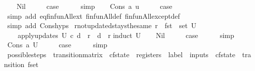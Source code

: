 \begin{isabellebody}
\ \ \isamarkupfalse%
\ Nil\isanewline
\ \ \isamarkupfalse%
\ \isamarkupfalse%
\ {\isacharquery}case\isanewline
\ \ \ \ \isamarkupfalse%
\ simp\isanewline
{}\isamarkupfalse%
\isanewline
\ \ \isamarkupfalse%
\ {\isacharparenleft}Cons\ a\ u{\isacharparenright}\isanewline
\ \ \isamarkupfalse%
\ \isamarkupfalse%
\ {\isacharquery}case\isanewline
\ \ \ \ \isamarkupfalse%
\ {\isacharparenleft}simp\ add{\isacharcolon}\ eq{\isacharunderscore}finfun{\isacharunderscore}All{\isacharunderscore}ext\ finfun{\isacharunderscore}All{\isacharunderscore}def\ finfun{\isacharunderscore}All{\isacharunderscore}except{\isacharunderscore}def{\isacharparenright}\isanewline
\ \ \ \ \isamarkupfalse%
\ {\isacharparenleft}simp\ add{\isacharcolon}\ Cons{\isachardot}hyps{\isacharparenright}\isanewline
{}\isamarkupfalse%
%
\endisatagproof
{\isafoldproof}%
%
\isadelimproof
\isanewline
%
\endisadelimproof
\isanewline
{}\isamarkupfalse%
\ r{\isacharunderscore}not{\isacharunderscore}updated{\isacharunderscore}stays{\isacharunderscore}the{\isacharunderscore}same{\isacharcolon}\ {\isachardoublequoteopen}r\ {\isasymnotin}\ fst\ {\isacharbackquote}\ set\ U\ {\isasymLongrightarrow}\isanewline
\ \ \ \ apply{\isacharunderscore}updates\ U\ c\ d\ {\isachardollar}\ r\ {\isacharequal}\ d\ {\isachardollar}\ r{\isachardoublequoteclose}\isanewline
%
\isadelimproof
%
\endisadelimproof
%
\isatagproof
{}\isamarkupfalse%
{\isacharparenleft}induct\ U{\isacharparenright}\isanewline
\ \ \isamarkupfalse%
\ Nil\isanewline
\ \ \isamarkupfalse%
\ \isamarkupfalse%
\ {\isacharquery}case\isanewline
\ \ \ \ \isamarkupfalse%
\ simp\isanewline
{}\isamarkupfalse%
\isanewline
\ \ \isamarkupfalse%
\ {\isacharparenleft}Cons\ a\ U{\isacharparenright}\isanewline
\ \ \isamarkupfalse%
\ \isamarkupfalse%
\ {\isacharquery}case\isanewline
\ \ \ \ \isamarkupfalse%
\ simp\isanewline
{}\isamarkupfalse%
%
\endisatagproof
{\isafoldproof}%
%
\isadelimproof
\isanewline
%
\endisadelimproof
\isanewline
{}\isamarkupfalse%
\ possible{\isacharunderscore}steps\ {\isacharcolon}{\isacharcolon}\ {\isachardoublequoteopen}transition{\isacharunderscore}matrix\ {\isasymRightarrow}\ cfstate\ {\isasymRightarrow}\ registers\ {\isasymRightarrow}\ label\ {\isasymRightarrow}\ inputs\ {\isasymRightarrow}\ {\isacharparenleft}cfstate\ {\isasymtimes}\ transition{\isacharparenright}\ fset{\isachardoublequoteclose}\ \isanewline

\end{isabellebody}
